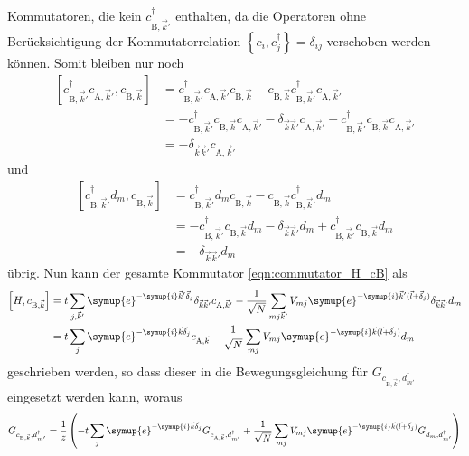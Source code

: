 Kommutatoren, die kein $c^\dagger_{\text{B},\vec{k}'}$ enthalten, da die Operatoren ohne Berücksichtigung der Kommutatorrelation 
$\left \{ c_i, c^\dagger_j \right \} = \delta_{ij}$ verschoben werden können.
Somit bleiben nur noch 
\begin{align*}
    \left [ c^\dagger_{\text{B},\vec{k}'} c_{\text{A},\vec{k}'}, c_{\text{B},\vec{k}} \right ]
        &= c^\dagger_{\text{B},\vec{k}'} c_{\text{A},\vec{k}'} c_{\text{B},\vec{k}} - c_{\text{B},\vec{k}} c^\dagger_{\text{B},\vec{k}'} c_{\text{A},\vec{k}'} \\
        &= - c^\dagger_{\text{B},\vec{k}'} c_{\text{B},\vec{k}} c_{\text{A},\vec{k}'} - \delta_{\vec{k}\vec{k}'} c_{\text{A},\vec{k}'}
        + c^\dagger_{\text{B},\vec{k}'} c_{\text{B},\vec{k}} c_{\text{A},\vec{k}'} \\
        &=  - \delta_{\vec{k}\vec{k}'} c_{\text{A},\vec{k}'}
\end{align*}
und 
\begin{align*}
    \left [ c^\dagger_{\text{B},\vec{k}'} d_m, c_{\text{B},\vec{k}} \right ] &=
        c^\dagger_{\text{B},\vec{k}'} d_m c_{\text{B},\vec{k}} - c_{\text{B},\vec{k}} c^\dagger_{\text{B},\vec{k}'} d_m \\
        &= - c^\dagger_{\text{B},\vec{k}'} c_{\text{B},\vec{k}} d_m - \delta_{\vec{k}\vec{k}'} d_m + c^\dagger_{\text{B},\vec{k}'} c_{\text{B},\vec{k}} d_m \\
        &= - \delta_{\vec{k}\vec{k}'} d_m
\end{align*}
übrig.
Nun kann der gesamte Kommutator \eqref{eqn:commutator_H_cB} als 
\begin{align*}
    \left [ H, c_{\text{B},\vec{k}} \right ]
     &= t \sum_{j,\vec{k}'} \symup{e}^{-\symup{i}\vec{k}' \vec{\delta}_j} \delta_{\vec{k}\vec{k}'} c_{\text{A},\vec{k}'}
      - \frac{1}{\sqrt{N}}\sum_{mj\vec{k}'} V_{mj} \symup{e}^{-\symup{i}\vec{k}' (\vec{l} + \vec{\delta}_j)} \delta_{\vec{k}\vec{k}'} d_m  \\
     &=  t \sum_{j} \symup{e}^{-\symup{i}\vec{k} \vec{\delta}_j} c_{\text{A},\vec{k}}
     - \frac{1}{\sqrt{N}}\sum_{mj} V_{mj} \symup{e}^{-\symup{i}\vec{k} (\vec{l} + \vec{\delta}_j)} d_m
\end{align*}
geschrieben werden, so dass dieser in die Bewegungsgleichung für $G_{c_{\text{B},\vec{k}}, d^\dagger_{m'}}$ eingesetzt werden kann, woraus
\begin{align}
    G_{c_{\text{B},\vec{k}}, d^\dagger_{m'}} =\frac{1}{z} \left (- t \sum_{j} \symup{e}^{-\symup{i}\vec{k} \vec{\delta}_j} G_{c_{\text{A},\vec{k}},d^\dagger_{m'}} + 
    \frac{1}{\sqrt{N}} \sum_{mj} V_{mj} \symup{e}^{-\symup{i}\vec{k} (\vec{l}+ \vec{\delta}_j)} G_{d_m, d_{m'}^\dagger} \right )  \label{eqn:greensfunction_cB}
\end{align}
